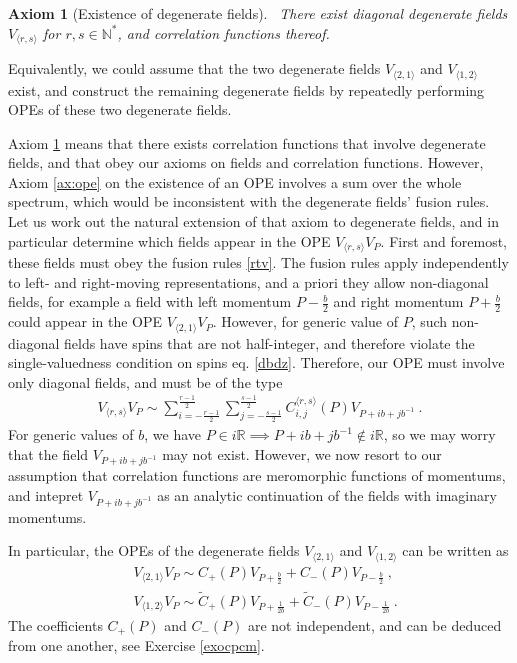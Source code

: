 \documentclass[12pt, a4paper, notitlepage, twoside]{report}
\numberwithin{equation}{section}
\theoremstyle{break}
\newtheorem{hyp}{Axiom}[chapter]
\begin{document}
\begin{hyp}[Existence of degenerate fields]
 ~\label{ax:edf}
There exist diagonal degenerate fields $V_{\langle r,s \rangle}$ for $r,s\in\mathbb{N}^*$, and correlation functions thereof.
\end{hyp}
\noindent
Equivalently, we could assume that the two degenerate fields $V_{\langle 2,1\rangle}$ and $V_{\langle 1,2\rangle}$ exist, and construct the remaining degenerate fields by repeatedly performing OPEs of these two degenerate fields.

Axiom \ref{ax:edf} means that there exists correlation functions that involve degenerate fields, and that obey our axioms on fields and correlation functions. However, Axiom \ref{ax:ope} on the existence of an OPE involves a sum over the whole spectrum, which would be inconsistent with the degenerate fields' fusion rules. 
Let us work out the natural extension of that axiom to degenerate fields, and in particular determine which fields appear in the OPE $V_{\langle r,s \rangle} V_P$. First and foremost, these fields must obey the fusion rules
\eqref{rtv}. The fusion rules apply independently to left- and right-moving representations, and  a priori they allow non-diagonal fields, for example a field with left momentum $P-\frac{b}{2}$ and right momentum $P+\frac{b}{2}$ could appear in the OPE $V_{\langle 2,1\rangle} V_P$. However, for generic value of $P$, such non-diagonal fields have spins that are not half-integer, and therefore violate the single-valuedness condition on spins eq. \eqref{dbdz}.
Therefore, our OPE must involve only diagonal fields, and must be of the type
\begin{align}
 \boxed{V_{\langle r,s \rangle} V_P \sim \sum_{i=-\frac{r-1}{2}}^{\frac{r-1}{2}} \sum_{j=-\frac{s-1}{2}}^{\frac{s-1}{2}}  C_{i,j}^{\langle r,s \rangle}(P) V_{P + ib+jb^{-1}}}\ .
\label{vrsv}
\end{align}
For generic values of $b$, we have $P\in i\mathbb{R} \implies P+ib+jb^{-1}\notin i\mathbb{R}$, so we may worry that the field $ V_{P + ib+jb^{-1}}$ may not exist. However, we now resort to our assumption that correlation functions are meromorphic functions of momentums, and intepret $ V_{P + ib+jb^{-1}}$ as an analytic continuation of the fields with imaginary momentums.

In particular, the OPEs of the degenerate fields $V_{\langle 2,1\rangle}$ and $V_{\langle 1,2\rangle}$ can be written as 
\begin{align}
 &\boxed{V_{\langle 2,1 \rangle} V_P \sim C_+(P) V_{P+\frac{b}{2}} + C_-(P) V_{P-\frac{b}{2}}}\ ,
\label{vot}
\\
& \boxed{V_{\langle 1,2 \rangle} V_P \sim \tilde{C}_+(P) V_{P+\frac{1}{2b}} + \tilde{C}_-(P) V_{P-\frac{1}{2b}}}\ .
 \label{vto}
\end{align}
The coefficients $C_+(P)$ and $C_-(P)$ are not independent, and can be deduced from one another, see Exercise \ref{exocpcm}.
\end{document}
